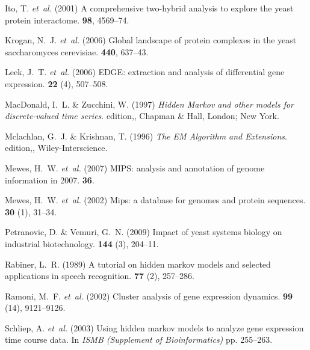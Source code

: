 \documentclass{bioinfo}
\begin{document}
\begin{thebibliography}{}
Ito, T. {\em et~al.}
  (2001{\em{}}) A comprehensive two-hybrid analysis to explore the yeast
  protein interactome.
 {\bf 98}, 4569--74.

Krogan, N.~J. {\em et~al.} (2006{\em{}}) Global landscape of protein
  complexes in the yeast saccharomyces cerevisiae.
 {\bf 440}, 637--43.

Leek, J.~T. {\em et~al.} (2006{\em{}}) {EDGE:
  extraction and analysis of differential gene expression}.
 {\bf 22} (4), 507--508.

MacDonald, I.~L. \& Zucchini, W. (1997{\em{}}) {\em Hidden Markov and other
  models for discrete-valued time series}.
 edition,, Chapman \& Hall, London; New York.

Mclachlan, G.~J. \& Krishnan, T. (1996{\em{}}) {\em The EM Algorithm and
  Extensions}.
 edition,, Wiley-Interscience.

Mewes, H.~W. {\em et~al.} (2007{\em{}}) {MIPS: analysis and annotation of genome information in
  2007}.
 {\bf 36}.

Mewes, H.~W. {\em et~al.} (2002{\em{}}) Mips: a database for genomes and protein sequences.
 {\bf 30} (1), 31--34.

Petranovic, D. \& Vemuri, G.~N. (2009{\em{}}) Impact of yeast systems biology
  on industrial biotechnology.
 {\bf 144} (3), 204--11.

Rabiner, L.~R. (1989{\em{}}) A tutorial on hidden markov models and selected
  applications in speech recognition.
 {\bf 77} (2), 257--286.

Ramoni, M.~F. {\em et~al.} (2002{\em{}}) Cluster analysis
  of gene expression dynamics.
 {\bf 99} (14), 9121--9126.

Schliep, A. {\em et~al.} (2003{\em{}}) Using hidden
  markov models to analyze gene expression time course data.
\newblock In {\em ISMB (Supplement of Bioinformatics)} pp. 255--263.


\end{thebibliography}
\end{document}
